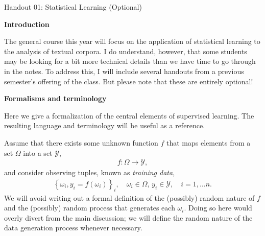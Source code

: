 \documentclass[12pt,hidelinks]{article}
\numberwithin{equation}{section}
\begin{document}
{\LARGE Handout 01: Statistical Learning (Optional)}

\vspace*{18pt}

\textbf{Introduction}

The general course this year will focus on the application of statistical
learning to the analysis of textual corpora. I do understand, however, that
some students may be looking for a bit more technical details than we have
time to go through in the notes. To address this, I will include several
handouts from a previous semester's offering of the class. But please note
that these are entirely optional!

\vspace{12pt}
\textbf{Formalisms and terminology}

Here we give a formalization of the central
elements of supervised learning. The resulting language and terminology will
be useful as a reference.

Assume that there exists some unknown function $f$ that maps
elements from a set $\Omega$ into a set $\mathcal{Y}$,
\begin{align}
f: \Omega \rightarrow \mathcal{Y}, \label{abstract_slearn}
\end{align}
and consider observing tuples, known as \textit{training data},
\begin{align}
\left\{ \omega_i, y_i = f(\omega_i) \right\}_{i},
\quad \omega_i \in \Omega, \, y_i \in \mathcal{Y},
\quad i = 1, \ldots n.
\end{align}
We will avoid writing out a formal definition of the (possibly) random nature
of $f$ and the (possibly) random process that generates each $\omega_i$.
Doing so here would overly divert from the main discussion; we will define the
random nature of the data generation process whenever necessary.
\end{document}
